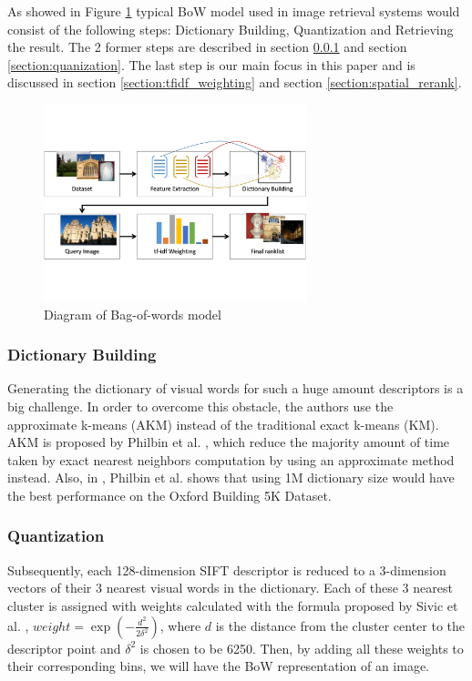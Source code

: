 \documentclass[10pt,conference,]{IEEEtran}
\begin{document}
As showed in Figure \ref{fig:bow_model} typical BoW model used in image retrieval systems would consist of the following steps: Dictionary Building, Quantization and Retrieving the result. The 2 former steps are described in section \ref{section:dictionary_building} and section \ref{section:quanization}. The last step is our main focus in this paper and is discussed in section \ref{section:tfidf_weighting} and section \ref{section:spatial_rerank}.

\begin{figure}
    \centering
    \includegraphics[width=3.0in]{process.pdf}
    \caption{Diagram of Bag-of-words model}
    \label{fig:bow_model}
\end{figure}

\subsubsection{Dictionary Building} \label{section:dictionary_building}

Generating the dictionary of visual words for such a huge amount descriptors is a big challenge. In order to overcome this obstacle, the authors use the approximate k-means (AKM) instead of the traditional exact k-means (KM). AKM is proposed by Philbin et al. \cite{2}, which reduce the majority amount of time taken by exact nearest neighbors computation by using an approximate method instead. Also, in \cite{2}, Philbin et al. shows that using 1M dictionary size would have the best performance on the Oxford Building 5K Dataset.

\subsubsection{Quantization} \label{section:quantization}

Subsequently, each 128-dimension SIFT descriptor is reduced to a 3-dimension vectors of their 3 nearest visual words in the dictionary. Each of these 3 nearest cluster is assigned with weights calculated with the formula proposed by Sivic et al. \cite{7}, $weight = \exp(-\frac{d^2}{2\delta^2})$, where $d$ is the distance from the cluster center to the descriptor point and $\delta^2$ is chosen to be 6250. Then, by adding all these weights to their corresponding bins, we will have the BoW representation of an image.
\end{document}
